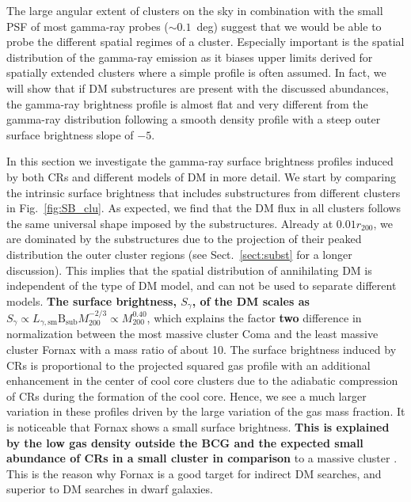 \documentclass[10pt,aps,pra,reprint,amsmath,amsfonts,amssymb,showpacs,nofootinbib,floatfix]{revtex4-1}
\def\C#1{{\bf #1}}
\newcommand{\rmn}{\mathrm}
\newcommand{\B}{\rmn{B}}
\newcommand{\bsub}{\B_\rmn{sub}}
\newcommand{\rvir}{r_{200}}
\newcommand{\mvir}{M_{200}}
\begin{document}
The large angular extent of clusters on the sky in combination with
the small PSF of most gamma-ray probes ($\sim 0.1$~deg) suggest that
we would be able to probe the different spatial regimes of a
cluster. Especially important is the spatial distribution of the
gamma-ray emission as it biases upper limits derived for spatially
extended clusters where a simple profile is often assumed. In fact, we
will show that if DM substructures are present with the discussed
abundances, the gamma-ray brightness profile is almost flat and very
different from the gamma-ray distribution following a smooth density
profile with a steep outer surface brightness slope of $-5$.

In this section we investigate the gamma-ray surface brightness
profiles induced by both CRs and different models of DM in more
detail. We start by comparing the intrinsic surface brightness that
includes substructures from different clusters in
Fig.~\ref{fig:SB_clu}. As expected, we find that the DM flux in all
clusters follows the same universal shape imposed by the
substructures. Already at $0.01\rvir$, we are dominated by the
substructures due to the projection of their peaked distribution the
outer cluster regions (see Sect.~\ref{sect:subst} for a longer
discussion). This implies that the spatial distribution of
annihilating DM is independent of the type of DM model, and can not be
used to separate different models. \C{The surface brightness,
  $S_\gamma$, of the DM scales as $S_\gamma\propto
  L_{\gamma,\rmn{sm}}\bsub\mvir^{-2/3} \propto \mvir^{0.40}$}, which
explains the factor \C{two} difference in normalization between the
most massive cluster Coma and the least massive cluster Fornax with a
mass ratio of about 10. The surface brightness induced by CRs is
proportional to the projected squared gas profile with an additional
enhancement in the center of cool core clusters due to the adiabatic
compression of CRs during the formation of the cool core. Hence, we
see a much larger variation in these profiles driven by the large
variation of the gas mass fraction. It is noticeable that Fornax shows
a small surface brightness. \C{This is explained by the low gas
  density outside the BCG and the expected small abundance of CRs in a
  small cluster in comparison} to a massive cluster
\cite{2010MNRAS.409..449P}.  This is the reason why Fornax is  a
good target for indirect DM searches, and superior to DM searches in
dwarf galaxies.
\end{document}
